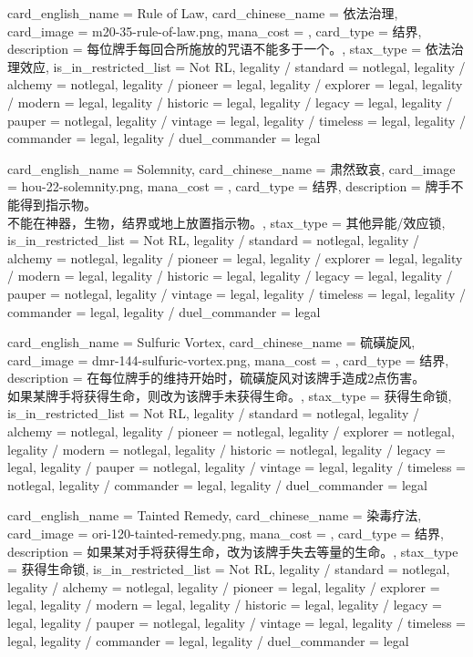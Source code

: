 \documentclass[lang = cn, color = black, 10pt]{AllThatStax}
\begin{document}
\card
{
	card_english_name = {Rule of Law},
	card_chinese_name = {依法治理},
	card_image = m20-35-rule-of-law.png,
	mana_cost = ,
	card_type = 结界,
	description = {每位牌手每回合所施放的咒语不能多于一个。},
	stax_type = 依法治理效应,
	is_in_restricted_list = Not RL,
	legality / standard = notlegal,
	legality / alchemy = notlegal,
	legality / pioneer = legal,
	legality / explorer = legal,
	legality / modern = legal,
	legality / historic = legal,
	legality / legacy = legal,
	legality / pauper = notlegal,
	legality / vintage = legal,
	legality / timeless = legal,
	legality / commander = legal,
	legality / duel_commander = legal
}

\card
{
	card_english_name = {Solemnity},
	card_chinese_name = {肃然致哀},
	card_image = hou-22-solemnity.png,
	mana_cost = ,
	card_type = 结界,
	description = {牌手不能得到指示物。\\
不能在神器，生物，结界或地上放置指示物。},
	stax_type = 其他异能/效应锁,
	is_in_restricted_list = Not RL,
	legality / standard = notlegal,
	legality / alchemy = notlegal,
	legality / pioneer = legal,
	legality / explorer = legal,
	legality / modern = legal,
	legality / historic = legal,
	legality / legacy = legal,
	legality / pauper = notlegal,
	legality / vintage = legal,
	legality / timeless = legal,
	legality / commander = legal,
	legality / duel_commander = legal
}

\card
{
	card_english_name = {Sulfuric Vortex},
	card_chinese_name = {硫磺旋风},
	card_image = dmr-144-sulfuric-vortex.png,
	mana_cost = ,
	card_type = 结界,
	description = {在每位牌手的维持开始时，硫磺旋风对该牌手造成2点伤害。\\
如果某牌手将获得生命，则改为该牌手未获得生命。},
	stax_type = 获得生命锁,
	is_in_restricted_list = Not RL,
	legality / standard = notlegal,
	legality / alchemy = notlegal,
	legality / pioneer = notlegal,
	legality / explorer = notlegal,
	legality / modern = notlegal,
	legality / historic = notlegal,
	legality / legacy = legal,
	legality / pauper = notlegal,
	legality / vintage = legal,
	legality / timeless = notlegal,
	legality / commander = legal,
	legality / duel_commander = legal
}

\card
{
	card_english_name = {Tainted Remedy},
	card_chinese_name = {染毒疗法},
	card_image = ori-120-tainted-remedy.png,
	mana_cost = ,
	card_type = 结界,
	description = {如果某对手将获得生命，改为该牌手失去等量的生命。},
	stax_type = 获得生命锁,
	is_in_restricted_list = Not RL,
	legality / standard = notlegal,
	legality / alchemy = notlegal,
	legality / pioneer = legal,
	legality / explorer = legal,
	legality / modern = legal,
	legality / historic = legal,
	legality / legacy = legal,
	legality / pauper = notlegal,
	legality / vintage = legal,
	legality / timeless = legal,
	legality / commander = legal,
	legality / duel_commander = legal
}
\end{document}
